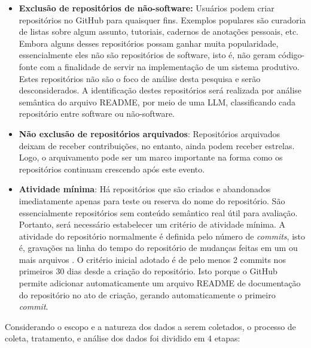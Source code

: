\documentclass[12pt,oneside,a4paper,brazil,sumario=tradicional]{abntex2}
\begin{document}
\begin{itemize}
  \item \textbf{Exclusão de repositórios de não-software:} Usuários podem criar repositórios no GitHub para quaisquer fins. Exemplos populares são curadoria de listas sobre algum assunto, tutoriais, cadernos de anotações pessoais, etc. Embora alguns desses repositórios possam ganhar muita popularidade, essencialmente eles não são repositórios de software, isto é, não geram código-fonte com a finalidade de servir na implementação de um sistema produtivo. Estes repositórios não são o foco de análise desta pesquisa e serão desconsiderados. A identificação destes repositórios será realizada por análise semântica do arquivo README, por meio de uma LLM, classificando cada repositório entre software ou não-software.
  \item \textbf{Não exclusão de repositórios arquivados}: Repositórios arquivados deixam de receber contribuições, no entanto, ainda podem receber estrelas. Logo, o arquivamento pode ser um marco importante na forma como os repositórios continuam crescendo após este evento.
  \item \textbf{Atividade mínima}: Há repositórios que são criados e abandonados imediatamente apenas para teste ou reserva do nome do repositório. São essencialmente repositórios sem conteúdo semântico real útil para avaliação. Portanto, será necessário estabelecer um critério de atividade mínima. A atividade do repositório normalmente é definida pelo número de \textit{commits}, isto é, gravações na linha do tempo do repositório de mudanças feitas em um ou mais arquivos \cite{github_about_commits, github2025}. O critério inicial adotado é de pelo menos 2 commits nos primeiros 30 dias desde a criação do repositório. Isto porque o GitHub permite adicionar automaticamente um arquivo README de documentação do repositório no ato de criação, gerando automaticamente o primeiro \textit{commit}.
\end{itemize}
Considerando o escopo e a natureza dos dados a serem coletados, o processo de coleta, tratamento, e análise dos dados foi dividido em 4 etapas:
\end{document}
